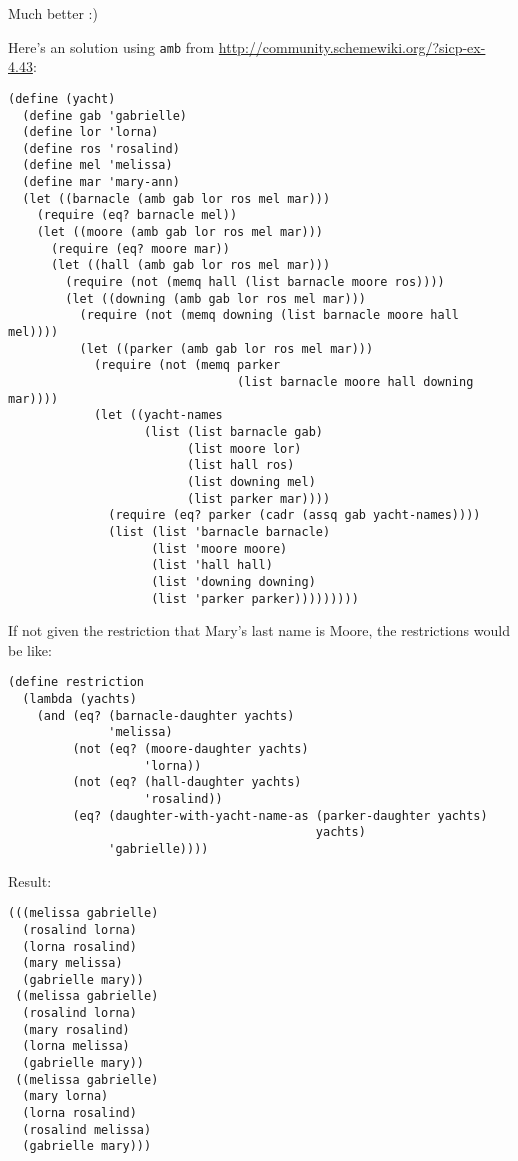 \documentclass[../main.tex]{subfiles}
\begin{document}
Much better :)

Here's an solution using \lstinline{amb} from \url{http://community.schemewiki.org/?sicp-ex-4.43}:

\begin{lstlisting}
(define (yacht) 
  (define gab 'gabrielle) 
  (define lor 'lorna) 
  (define ros 'rosalind) 
  (define mel 'melissa) 
  (define mar 'mary-ann) 
  (let ((barnacle (amb gab lor ros mel mar))) 
    (require (eq? barnacle mel)) 
    (let ((moore (amb gab lor ros mel mar))) 
      (require (eq? moore mar))     
      (let ((hall (amb gab lor ros mel mar))) 
        (require (not (memq hall (list barnacle moore ros))))  
        (let ((downing (amb gab lor ros mel mar))) 
          (require (not (memq downing (list barnacle moore hall mel)))) 
          (let ((parker (amb gab lor ros mel mar))) 
            (require (not (memq parker 
                                (list barnacle moore hall downing mar)))) 
            (let ((yacht-names 
                   (list (list barnacle gab) 
                         (list moore lor) 
                         (list hall ros) 
                         (list downing mel) 
                         (list parker mar)))) 
              (require (eq? parker (cadr (assq gab yacht-names)))) 
              (list (list 'barnacle barnacle) 
                    (list 'moore moore) 
                    (list 'hall hall) 
                    (list 'downing downing) 
                    (list 'parker parker)))))))))
\end{lstlisting}

If not given the restriction that Mary's last name is Moore, the restrictions would be like:

\begin{lstlisting}
(define restriction
  (lambda (yachts)
    (and (eq? (barnacle-daughter yachts)
              'melissa)
         (not (eq? (moore-daughter yachts)
                   'lorna))
         (not (eq? (hall-daughter yachts)
                   'rosalind))
         (eq? (daughter-with-yacht-name-as (parker-daughter yachts)
                                           yachts)
              'gabrielle))))
\end{lstlisting}

Result:

\begin{lstlisting}
(((melissa gabrielle)
  (rosalind lorna)
  (lorna rosalind)
  (mary melissa)
  (gabrielle mary))
 ((melissa gabrielle)
  (rosalind lorna)
  (mary rosalind)
  (lorna melissa)
  (gabrielle mary))
 ((melissa gabrielle)
  (mary lorna)
  (lorna rosalind)
  (rosalind melissa)
  (gabrielle mary)))
\end{lstlisting}
\end{document}
